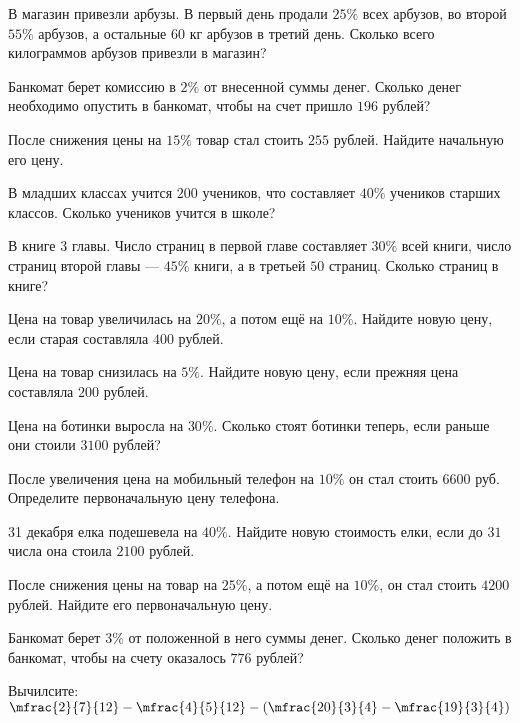 \begin{class}[number=4]
	\begin{listofex}
		\item В магазин привезли арбузы. В первый день продали \( 25\% \) всех арбузов, во второй \( 55\% \) арбузов, а остальные \( 60 \) кг арбузов в третий день. Сколько всего килограммов арбузов привезли в магазин?
		\item Банкомат берет комиссию в \( 2\% \) от внесенной суммы денег. Сколько денег необходимо опустить в банкомат, чтобы на счет пришло \( 196 \) рублей?
		\item После снижения цены на \( 15\% \) товар стал стоить \( 255 \) рублей. Найдите начальную его цену.
		\item В младших классах учится \( 200 \) учеников, что составляет \( 40\% \) учеников старших классов. Сколько учеников учится в школе?
		\item В книге \( 3 \) главы. Число страниц в первой главе составляет \( 30\% \) всей книги, число страниц второй главы --- \( 45\% \) книги, а в третьей \( 50 \) страниц. Сколько страниц в книге?
		\item  Цена на товар увеличилась на \( 20\% \), а потом ещё на \( 10\% \). Найдите новую цену, если старая составляла \( 400 \) рублей.
		\item  Цена на товар снизилась на \( 5\% \). Найдите новую цену, если прежняя цена составляла \( 200 \) рублей.
		\item Цена на ботинки выросла на \( 30\% \). Сколько стоят ботинки теперь, если раньше они стоили \( 3100 \) рублей?
		\item После увеличения цена на мобильный телефон на \( 10\% \) он стал стоить \( 6600 \) руб. Определите первоначальную цену телефона.
	\end{listofex}
\end{class}

\begin{homework}[number=2]
	\begin{listofex}
		\item 31 декабря елка подешевела на \( 40\% \). Найдите новую стоимость елки, если до \( 31 \) числа она стоила \( 2100 \) рублей.
		\item После снижения цены на товар на \( 25\% \), а потом ещё на \( 10\% \), он стал стоить \( 4200 \) рублей. Найдите его первоначальную цену.
		\item  Банкомат берет \( 3\% \) от положенной в него суммы денег. Сколько денег положить в банкомат, чтобы на счету оказалось \( 776 \) рублей?
		\item Вычилсите: \quad \( \mfrac{2}{7}{12}-\mfrac{4}{5}{12}-\left( \mfrac{20}{3}{4}-\mfrac{19}{3}{4} \right) \)
	\end{listofex}
\end{homework}

